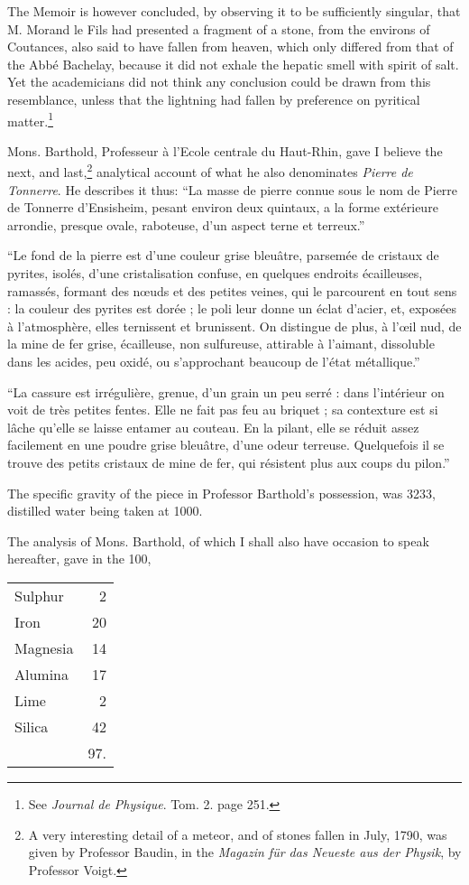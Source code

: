 \documentclass[a4paper, 12pt, oneside]{article}
\begin{document}
The Memoir is however concluded, by observing it to be sufficiently singular, that M. Morand le Fils had presented a fragment of a stone, from the environs of Coutances, also said to have fallen from heaven, which only differed from that of the Abbé Bachelay, because it did not exhale the hepatic smell with spirit of salt. Yet the academicians did not think any conclusion could be drawn from this resemblance, unless that the lightning had fallen by preference on pyritical matter.\footnote{See \emph{Journal de Physique}. Tom. 2. page 251.}

Mons. Barthold, Professeur à l'Ecole centrale du Haut-Rhin, gave I believe the next, and last,\footnote{A very interesting detail of a meteor, and of stones fallen in July, 1790, was given by Professor Baudin, in the \emph{Magazin für das Neueste aus der Physik}, by Professor Voigt.} analytical account of what he also denominates \emph{Pierre de Tonnerre}. He describes it thus: ``La masse de pierre connue sous le nom de Pierre de Tonnerre d'Ensisheim, pesant environ deux quintaux, a la forme extérieure arrondie, presque ovale, raboteuse, d'un aspect terne et terreux.''

``Le fond de la pierre est d'une couleur grise bleuâtre, parsemée de cristaux de pyrites, isolés, d'une cristalisation confuse, en quelques endroits écailleuses, ramassés, formant des nœuds et des petites veines, qui le parcourent en tout sens : la couleur des pyrites est dorée ; le poli leur donne un éclat d'acier, et, exposées à l'atmosphère, elles ternissent et brunissent. On distingue de plus, à l'œil nud, de la mine de fer grise, écailleuse, non sulfureuse, attirable à l'aimant, dissoluble dans les acides, peu oxidé, ou s'approchant beaucoup de l'état métallique.''

``La cassure est irrégulière, grenue, d'un grain un peu serré : dans l'intérieur on voit de très petites fentes. Elle ne fait pas feu au briquet ; sa contexture est si lâche qu'elle se laisse entamer au couteau. En la pilant, elle se réduit assez facilement en une poudre grise bleuâtre, d'une odeur terreuse. Quelquefois il se trouve des petits cristaux de mine de fer, qui résistent plus aux coups du pilon.''

The specific gravity of the piece in Professor Barthold's possession, was 3233, distilled water being taken at 1000.

The analysis of Mons. Barthold, of which I shall also have occasion to speak hereafter, gave in the 100,
\begin{table}[H]
    \centering
    \begin{tabular}{l r}
        Sulphur & 2 \\
        Iron & 20 \\ 
        Magnesia & 14 \\ 
        Alumina & 17 \\ 
        Lime & 2 \\ 
        Silica & 42 \\ \hline
        ~ & 97. \\ 
    \end{tabular}
\end{table}
\end{document}
